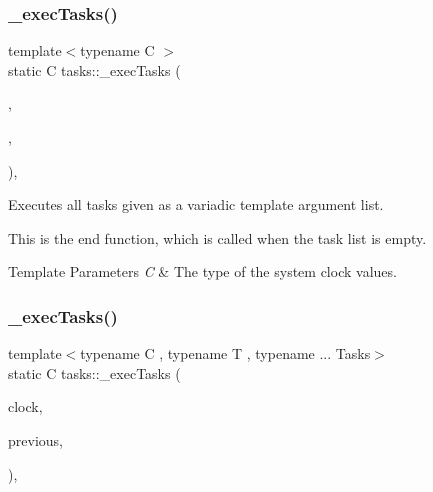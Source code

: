 \subsubsection{\texorpdfstring{\+\_\+exec\+Tasks()}{\_execTasks()}\hspace{0.1cm}{\footnotesize\ttfamily [1/3]}}
{\footnotesize\ttfamily template$<$typename C $>$ \\
static C tasks\+::\+\_\+exec\+Tasks (\begin{DoxyParamCaption}\item[{C}]{,  }\item[{C}]{,  }\item[{\+\_\+task\+\_\+list\+::\+Task\+List$<$$>$}]{ }\end{DoxyParamCaption})\hspace{0.3cm}{\ttfamily [inline]}, {\ttfamily [static]}}



Executes all tasks given as a variadic template argument list. 

This is the end function, which is called when the task list is empty.


\begin{DoxyTemplParams}{Template Parameters}
{\em C} & The type of the system clock values. \\
\hline
\end{DoxyTemplParams}
\hypertarget{namespacetasks_ad7c663940ffdccb226f739f2a09073fb}{}\label{namespacetasks_ad7c663940ffdccb226f739f2a09073fb} 
\subsubsection{\texorpdfstring{\+\_\+exec\+Tasks()}{\_execTasks()}\hspace{0.1cm}{\footnotesize\ttfamily [2/3]}}
{\footnotesize\ttfamily template$<$typename C , typename T , typename ... Tasks$>$ \\
static C tasks\+::\+\_\+exec\+Tasks (\begin{DoxyParamCaption}\item[{C}]{clock,  }\item[{C}]{previous,  }\item[{\+\_\+task\+\_\+list\+::\+Task\+List$<$ T, Tasks... $>$}]{ }\end{DoxyParamCaption})\hspace{0.3cm}{\ttfamily [inline]}, {\ttfamily [static]}}




